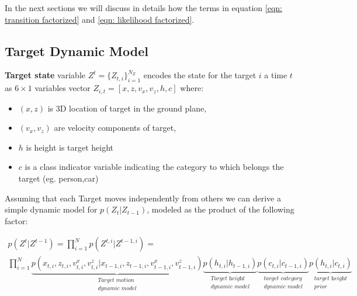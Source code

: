 In the next sections we will discuss in details how the terms in equation \ref{eqn: transition factorized} and \ref{eqn: likelihood factorized}.

\newpage

\subsection{Target Dynamic Model} 
\textbf{Target state} variable $Z^t = \{Z_{t,i} \}_{i=1}^{N_Z}$  encodes the state for the target $i$ a time $t$ as $6\times1$ variables vector $Z_ {i,t}=[ x,z,v_x,v_z,h,c]$ where:
\begin{itemize}
\item $(x, z)$ is 3D location of target in the ground plane,
\item $(v_x , v_z )$ are velocity components of target,
\item $h$ is height is target height
\item $c$ is a class indicator variable indicating the category to which belongs the target (eg. person,car)
\end{itemize}
Assuming that each Target moves independently from others we can derive a simple dynamic model for $ p(Z_t |Z_{t−1}) $, modeled as the product of the following factor:

\begin{eqnarray}\label{eqn: transition factorized}
p(Z^{t} |Z^{t-1} ) = \prod_{i=1}^{N} p(Z^{t,i} | Z^{t-1,i}) =  \\
\prod_{i=1}^{N} \underbrace{p(x_{t,i}, z_{t,i}, v_{t,i}^x,v_{t,i}^z | x_{t-1,i}, z_{t-1,i}, v_{t-1,i}^x,v_{t-1,i}^z)}_{\substack{\textit{Target motion } \\ \textit{dynamic model}}}
\underbrace{ p(h_{t,i} |h_{t-1,i})}_{\substack{\textit{Target height} \\ \textit{dynamic model}}}
\underbrace{ p(c_{t,i} |c_{t−1,i}) }_{\substack{\textit{target category} \\ \textit{dynamic model}}}
\underbrace{ p(h_{t,i} |c_{t,i}) }_{\substack{\textit{target height} \\ \textit{prior}}} \nonumber
\end{eqnarray}


